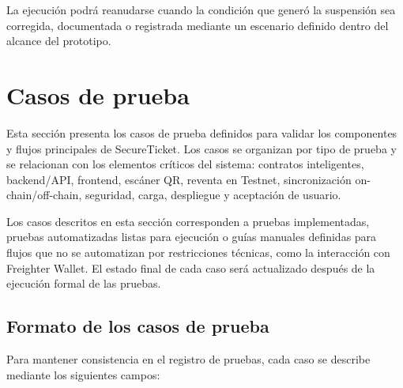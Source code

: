 \documentclass[12pt,letterpaper]{article}
\newcommand{\NombreProyecto}{SecureTicket}
\begin{document}
La ejecución podrá reanudarse cuando la condición que generó la suspensión sea corregida, documentada o registrada mediante un escenario definido dentro del alcance del prototipo.


\section{Casos de prueba}

Esta sección presenta los casos de prueba definidos para validar los componentes y flujos principales de \NombreProyecto{}. Los casos se organizan por tipo de prueba y se relacionan con los elementos críticos del sistema: contratos inteligentes, backend/API, frontend, escáner QR, reventa en Testnet, sincronización on-chain/off-chain, seguridad, carga, despliegue y aceptación de usuario.

Los casos descritos en esta sección corresponden a pruebas implementadas, pruebas automatizadas listas para ejecución o guías manuales definidas para flujos que no se automatizan por restricciones técnicas, como la interacción con Freighter Wallet. El estado final de cada caso será actualizado después de la ejecución formal de las pruebas.

\subsection{Formato de los casos de prueba}

Para mantener consistencia en el registro de pruebas, cada caso se describe mediante los siguientes campos:
\end{document}
